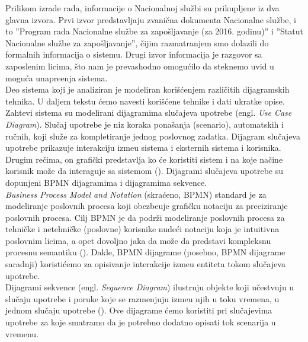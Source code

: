 Prilikom izrade rada, informacije o Nacionalnoj slu\v zbi su prikupljene iz dva glavna izvora. Prvi izvor predstavljaju zvani\v cna dokumenta Nacionalne slu\v zbe, i to ''Program rada Nacionalne slu\v zbe za zapo\v sljavanje (za 2016. godinu)'' i ''Statut Nacionalne slu\v zbe za zapo\v sljavanje'', \v cijim razmatranjem smo dolazili do formalnih informacija o sistemu. Drugi izvor informacija je razgovor sa zaposlenim licima, \v sto nam je prevashodno omogu\' cilo da steknemo uvid u mogu\' ca unapre\dj enja sistema.\\

Deo sistema koji je analiziran je modeliran kori\v s\' cenjem razli\v citih dijagramskih tehnika. U daljem tekstu \'cemo navesti kori\v s\'cene tehnike i dati ukratke opise.\\

Zahtevi sistema su modelirani dijagramima slu\v cajeva upotrebe (engl. \textit{Use Case Diagram}). Slu\v caj upotrebe je niz koraka pona\v sanja (scenario), automatskih i ru\v cnih, koji slu\v ze za kompletiranje jednog poslovnog zadatka. Dijagram slu\v cajeva upotrebe prikazuje interakciju izme\dj u sistema i eksternih sistema i korisnika. Drugim re\v cima, on grafi\v cki predstavlja ko \' ce koristiti sistem i na koje na\v cine korisnik mo\v ze da interaguje sa sistemom (\cite{SADM}). Dijagrami slu\v cajeva upotrebe su dopunjeni BPMN dijagramima i dijagramima sekvence.\\

\textit{Business Process Model and Notation} (skra\' ceno, BPMN) standard je za modeliranje poslovnih procesa koji obezbe\dj uje grafi\v cku notaciju za preciziranje poslovnih procesa. Cilj BPMN je da podr\v zi modeliranje poslovnih procesa za tehni\v cke i netehni\v cke (poslovne) korisnike nude\' ci notaciju koja je intuitivna poslovnim licima, a opet dovoljno jaka da mo\v ze da predstavi kompleksnu procesnu semantiku (\cite{BPMN}). Dakle, BPMN dijagrame (posebno, BPMN dijagrame saradnji) koristi\' cemo za opisivanje interakcije izme\dj u entiteta tokom slu\v cajeva upotrebe.\\

Dijagrami sekvence (engl. \textit{Sequence Diagram}) ilustruju objekte koji u\v cestvuju u slu\v caju upotrebe i poruke koje se razmenjuju izme\dj u njih u toku vremena, u jednom slu\v caju upotrebe (\cite{SAAD}). Ove dijagrame \' cemo koristiti pri slu\v cajevima upotrebe za koje smatramo da je potrebno dodatno opisati tok scenarija u vremenu.\\

